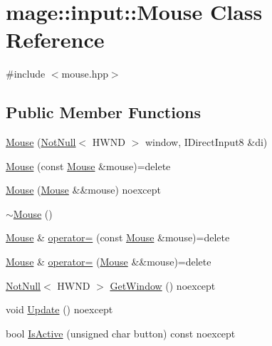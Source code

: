 \hypertarget{classmage_1_1input_1_1_mouse}{}\section{mage\+:\+:input\+:\+:Mouse Class Reference}
\label{classmage_1_1input_1_1_mouse}


{\ttfamily \#include $<$mouse.\+hpp$>$}

\subsection*{Public Member Functions}
\begin{DoxyCompactItemize}
\item 
\mbox{\hyperlink{classmage_1_1input_1_1_mouse_add3fd231e5af4f3669eaa8d5f8d157ec}{Mouse}} (\mbox{\hyperlink{namespacemage_a8769f9d670d6b585ea306cb1062af94b}{Not\+Null}}$<$ H\+W\+ND $>$ window, I\+Direct\+Input8 \&di)
\item 
\mbox{\hyperlink{classmage_1_1input_1_1_mouse_a4f560bb3a59f6cee57e7cd03b24ef218}{Mouse}} (const \mbox{\hyperlink{classmage_1_1input_1_1_mouse}{Mouse}} \&mouse)=delete
\item 
\mbox{\hyperlink{classmage_1_1input_1_1_mouse_a6e8185b9b2f0fdcd63a191389eb2b050}{Mouse}} (\mbox{\hyperlink{classmage_1_1input_1_1_mouse}{Mouse}} \&\&mouse) noexcept
\item 
\mbox{\hyperlink{classmage_1_1input_1_1_mouse_abfc6391c896b029e38ffa1341dcf9963}{$\sim$\+Mouse}} ()
\item 
\mbox{\hyperlink{classmage_1_1input_1_1_mouse}{Mouse}} \& \mbox{\hyperlink{classmage_1_1input_1_1_mouse_af4ce64a7808af28c80bc9c01c83f7d14}{operator=}} (const \mbox{\hyperlink{classmage_1_1input_1_1_mouse}{Mouse}} \&mouse)=delete
\item 
\mbox{\hyperlink{classmage_1_1input_1_1_mouse}{Mouse}} \& \mbox{\hyperlink{classmage_1_1input_1_1_mouse_a05d2471a4f517cc1970df352e7a68724}{operator=}} (\mbox{\hyperlink{classmage_1_1input_1_1_mouse}{Mouse}} \&\&mouse)=delete
\item 
\mbox{\hyperlink{namespacemage_a8769f9d670d6b585ea306cb1062af94b}{Not\+Null}}$<$ H\+W\+ND $>$ \mbox{\hyperlink{classmage_1_1input_1_1_mouse_a5fd893af2aede58106b718448e7e0dde}{Get\+Window}} () noexcept
\item 
void \mbox{\hyperlink{classmage_1_1input_1_1_mouse_aa4eb9865206c2b946f8d21106d378907}{Update}} () noexcept
\item 
bool \mbox{\hyperlink{classmage_1_1input_1_1_mouse_ac26bb38af310da51fadba94fac850fbe}{Is\+Active}} (unsigned char button) const noexcept

\end{DoxyCompactItemize}
